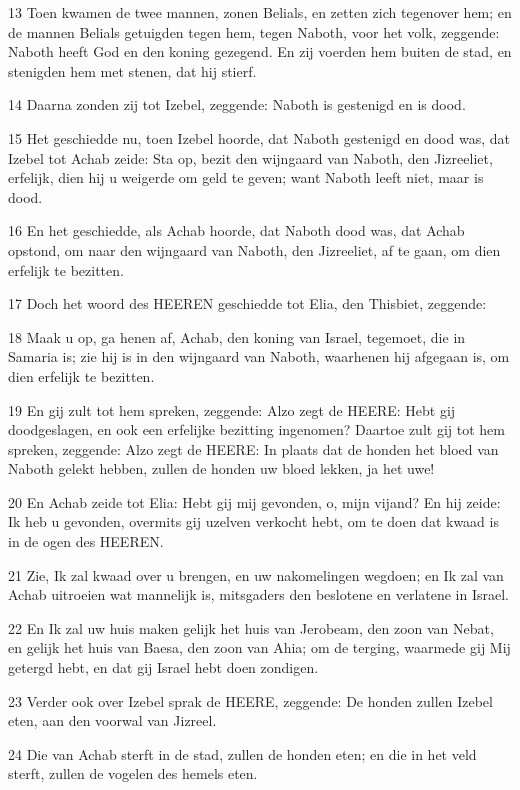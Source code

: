 \par 13 Toen kwamen de twee mannen, zonen Belials, en zetten zich tegenover hem; en de mannen Belials getuigden tegen hem, tegen Naboth, voor het volk, zeggende: Naboth heeft God en den koning gezegend. En zij voerden hem buiten de stad, en stenigden hem met stenen, dat hij stierf.
\par 14 Daarna zonden zij tot Izebel, zeggende: Naboth is gestenigd en is dood.
\par 15 Het geschiedde nu, toen Izebel hoorde, dat Naboth gestenigd en dood was, dat Izebel tot Achab zeide: Sta op, bezit den wijngaard van Naboth, den Jizreeliet, erfelijk, dien hij u weigerde om geld te geven; want Naboth leeft niet, maar is dood.
\par 16 En het geschiedde, als Achab hoorde, dat Naboth dood was, dat Achab opstond, om naar den wijngaard van Naboth, den Jizreeliet, af te gaan, om dien erfelijk te bezitten.
\par 17 Doch het woord des HEEREN geschiedde tot Elia, den Thisbiet, zeggende:
\par 18 Maak u op, ga henen af, Achab, den koning van Israel, tegemoet, die in Samaria is; zie hij is in den wijngaard van Naboth, waarhenen hij afgegaan is, om dien erfelijk te bezitten.
\par 19 En gij zult tot hem spreken, zeggende: Alzo zegt de HEERE: Hebt gij doodgeslagen, en ook een erfelijke bezitting ingenomen? Daartoe zult gij tot hem spreken, zeggende: Alzo zegt de HEERE: In plaats dat de honden het bloed van Naboth gelekt hebben, zullen de honden uw bloed lekken, ja het uwe!
\par 20 En Achab zeide tot Elia: Hebt gij mij gevonden, o, mijn vijand? En hij zeide: Ik heb u gevonden, overmits gij uzelven verkocht hebt, om te doen dat kwaad is in de ogen des HEEREN.
\par 21 Zie, Ik zal kwaad over u brengen, en uw nakomelingen wegdoen; en Ik zal van Achab uitroeien wat mannelijk is, mitsgaders den beslotene en verlatene in Israel.
\par 22 En Ik zal uw huis maken gelijk het huis van Jerobeam, den zoon van Nebat, en gelijk het huis van Baesa, den zoon van Ahia; om de terging, waarmede gij Mij getergd hebt, en dat gij Israel hebt doen zondigen.
\par 23 Verder ook over Izebel sprak de HEERE, zeggende: De honden zullen Izebel eten, aan den voorwal van Jizreel.
\par 24 Die van Achab sterft in de stad, zullen de honden eten; en die in het veld sterft, zullen de vogelen des hemels eten.
